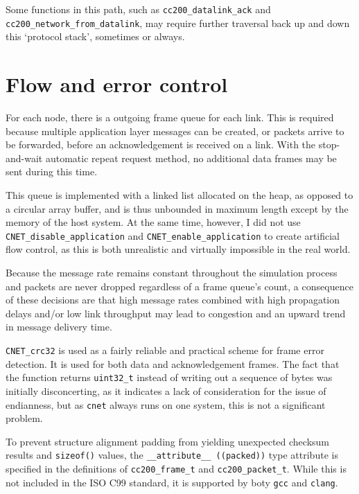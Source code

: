 \documentclass[a4paper,12pt,titlepage]{article}
\begin{document}
Some functions in this path, such as \texttt{cc200\_datalink\_ack} and
\texttt{cc200\_network\_from\_datalink}, may require further traversal back up
and down this `protocol stack', sometimes or always.

\section{Flow and error control}

For each node, there is a outgoing frame queue for each link. This is required
because multiple application layer messages can be created, or packets arrive
to be forwarded, before an acknowledgement is received on a link. With the
stop-and-wait automatic repeat request method, no additional data frames may
be sent during this time.

This queue is implemented with a linked list allocated on the heap, as opposed
to a circular array buffer, and is thus unbounded in maximum length except by
the memory of the host system. At the same time, however, I did not use
\texttt{CNET\_disable\_application} and \texttt{CNET\_enable\_application} to
create artificial flow control, as this is both unrealistic and virtually
impossible in the real world.

Because the message rate remains constant throughout the simulation process and
packets are never dropped regardless of a frame queue's count, a consequence of
these decisions are that high message rates combined with high propagation
delays and/or low link throughput may lead to congestion and an upward trend in
message delivery time.

\texttt{CNET\_crc32} is used as a fairly reliable and practical scheme for
frame error detection. It is used for both data and acknowledgement frames. The
fact that the function returns \texttt{uint32\_t} instead of writing out a sequence of bytes was initially disconcerting, as it indicates a lack of
consideration for the issue of endianness, but as \texttt{cnet} always runs on
one system, this is not a significant problem.

To prevent structure alignment padding from yielding unexpected checksum
results and \texttt{sizeof()} values, the \texttt{\_\_attribute\_\_ ((packed))}
type attribute is specified in the definitions of \texttt{cc200\_frame\_t} and
\texttt{cc200\_packet\_t}. While this is not included in the ISO C99 standard,
it is supported by boty \texttt{gcc} and \texttt{clang}.
\end{document}
